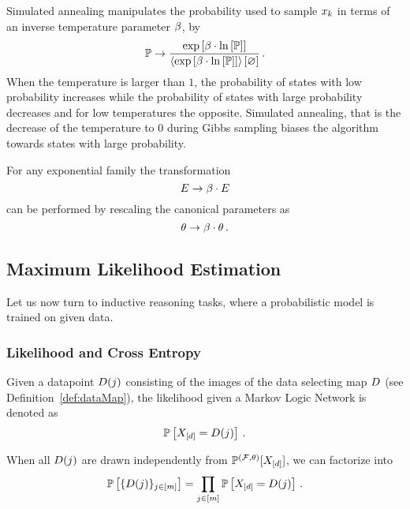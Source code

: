 	Simulated annealing manipulates the probability used to sample $x_{k}$ in terms of an inverse temperature parameter $\beta$, by
		\[ \mathbb{P} \rightarrow \frac{\mathrm{exp}\left[\beta\cdot\ln \left[ \mathbb{P} \right]\right]}{\left\langle \mathrm{exp}\left[\beta\cdot\ln \left[ \mathbb{P} \right]\right]\right\rangle \left[ \varnothing \right] } \, . \]
	When the temperature is larger than $1$, the probability of states with low probability increases while the probability of states with large probability decreases and for low temperatures the opposite.
	Simulated annealing, that is the decrease of the temperature to $0$ during Gibbs sampling biases the algorithm towards states with large probability.

	For any exponential family the transformation 
		\[ E \rightarrow \beta \cdot E  \]
	can be performed by rescaling the canonical parameters as
		\[ \theta \rightarrow \beta \cdot \theta \, . \]







\subsection{Maximum Likelihood Estimation} %

Let us now turn to inductive reasoning tasks, where a probabilistic model is trained on given data.

\subsubsection{Likelihood and Cross Entropy}

Given a datapoint $D(j)$ consisting of the images of the data selecting map $D$ (see Definition~\ref{def:dataMap}), the likelihood given a Markov Logic Network is denoted as
	\[ \mathbb{P}\left[X_{[d]} = D(j)\right] \, . \]
	
When all $D(j)$ are drawn independently from $\mathbb{P}^{(\mathcal{F},\theta)}[X_{[d]}]$, we can factorize into
	\[ \mathbb{P}\left[\{D(j)\}_{j\in[m]}\right]  = \prod_{j\in[m]} \mathbb{P}\left[X_{[d]}=D(j)\right] \, . \]


